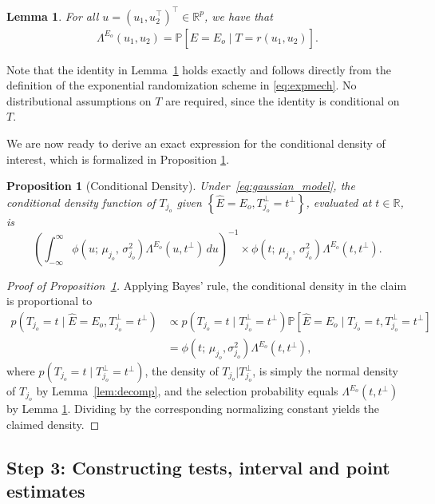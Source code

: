 \documentclass[12pt]{article}
\newcommand{\nbracket}[1]{\left( #1 \right)}
\newcommand{\cbracket}[1]{\left\{ #1 \right\}}
\newcommand{\rbracket}[1]{\left[ #1 \right]}
\newtheorem{proposition}{Proposition}[section]
\newtheorem{lemma}[theorem]{Lemma}
\newcommand{\real}{\mathbb{R}}
\newcommand{\Pp}{{\mathbb{P}}}
\newcommand{\Ehat}{\widehat{E}}
\begin{document}
\begin{lemma}
\label{lem:lambda_prob}
For all $u = (u_1, u_2^\top)^\top \in \real^p$, we have that
\begin{align*}
  \Lambda^{E_o}(u_1, u_2)
  = \Pp\rbracket{\Ehat = E_o \mid T = r(u_1, u_2)}.
\end{align*}
\end{lemma}

Note that the identity in Lemma~\ref{lem:lambda_prob} holds exactly and follows directly from the definition of the exponential randomization scheme in \eqref{eq:expmech}.
No distributional assumptions on $T$ are required, since the identity is conditional on $T$.

We are now ready to derive an exact expression for the conditional density of interest, which is formalized in Proposition \ref{prop:cond_density}. 

\begin{proposition}[Conditional Density]
\label{prop:cond_density}
Under~\eqref{eq:gaussian_model}, the conditional density function of $T_{j_o}$ given $\cbracket{\Ehat = E_o , T_{j_o}^\perp = t^\perp}$, evaluated at $t \in \real$, is
\[ \left(\displaystyle\int_{-\infty}^{\infty}
    \phi\nbracket{u;\, \mu_{j_o},\, \sigma_{j_o}^2}  \Lambda^{E_o}\nbracket{u, t^\perp}
    \, du \right)^{-1} \times  \phi\nbracket{t;\, \mu_{j_o},\, \sigma_{j_o}^2}
\Lambda^{E_o}\nbracket{t, t^\perp}.
\]
\end{proposition}


\begin{proof}[Proof of Proposition~\ref{prop:cond_density}]
Applying Bayes’ rule, the conditional density in the claim is proportional to
\begin{align*}
  p(T_{j_o}=t \mid \Ehat=E_o, T_{j_o}^\perp=t^\perp) 
  &\propto p(T_{j_o}=t \mid T_{j_o}^\perp=t^\perp)\Pp[\Ehat=E_o \mid T_{j_o}=t, T_{j_o}^\perp=t^\perp]  \\
  &=  \phi(t;\, \mu_{j_o}, \sigma_{j_o}^2)  \Lambda^{E_o}(t, t^\perp),
\end{align*}
where $p(T_{j_o}=t \mid T_{j_o}^\perp=t^\perp)$, the density of $T_{j_o} \lvert T_{j_o}^{\perp}$, is simply the normal density of $T_{j_o}$ by Lemma~\ref{lem:decomp}, and the selection probability equals $\Lambda^{E_o}(t, t^\perp)$ by Lemma \ref{lem:lambda_prob}.
Dividing by the corresponding normalizing constant yields the claimed density.
\end{proof}


\subsection{Step 3: Constructing tests, interval and point estimates}
\label{sec:pivot}
\end{document}
